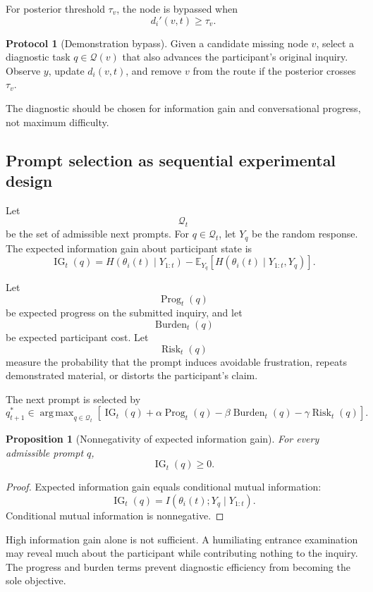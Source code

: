 \documentclass[11pt]{article}
\newtheorem{proposition}[definition]{Proposition}
\theoremstyle{definition}
\newtheorem{protocol}[definition]{Protocol}
\DeclareMathOperator{\argmax}{arg\,max}
\DeclareMathOperator{\IG}{IG}
\DeclareMathOperator{\Prog}{Prog}
\DeclareMathOperator{\Burden}{Burden}
\DeclareMathOperator{\Risk}{Risk}
\newcommand{\E}{\mathbb{E}}
\begin{document}
For posterior threshold \(\tau_v\), the node is bypassed when
\[
d_i'(v,t)\geq\tau_v.
\]

\begin{protocol}[Demonstration bypass]
Given a candidate missing node \(v\), select a diagnostic task \(q\in\mathcal Q(v)\) that also advances the participant's original inquiry. Observe \(y\), update \(d_i(v,t)\), and remove \(v\) from the route if the posterior crosses \(\tau_v\).
\end{protocol}

The diagnostic should be chosen for information gain and conversational progress, not maximum difficulty.

\subsection{Prompt selection as sequential experimental design}

Let
\[
\mathcal Q_t
\]
be the set of admissible next prompts. For \(q\in\mathcal Q_t\), let \(Y_q\) be the random response. The expected information gain about participant state is
\[
\IG_t(q)
=
H(\theta_i(t)\mid Y_{1:t})
-
\E_{Y_q}
\left[
H(\theta_i(t)\mid Y_{1:t},Y_q)
\right].
\]

Let
\[
\Prog_t(q)
\]
be expected progress on the submitted inquiry, and let
\[
\Burden_t(q)
\]
be expected participant cost. Let
\[
\Risk_t(q)
\]
measure the probability that the prompt induces avoidable frustration, repeats demonstrated material, or distorts the participant's claim.

The next prompt is selected by
\[
q_{t+1}^{*}
\in
\argmax_{q\in\mathcal Q_t}
\left[
\IG_t(q)
+
\alpha\Prog_t(q)
-
\beta\Burden_t(q)
-
\gamma\Risk_t(q)
\right].
\]

\begin{proposition}[Nonnegativity of expected information gain]
For every admissible prompt \(q\),
\[
\IG_t(q)\geq0.
\]
\end{proposition}

\begin{proof}
Expected information gain equals conditional mutual information:
\[
\IG_t(q)
=
I(\theta_i(t);Y_q\mid Y_{1:t}).
\]
Conditional mutual information is nonnegative.
\end{proof}

High information gain alone is not sufficient. A humiliating entrance examination may reveal much about the participant while contributing nothing to the inquiry. The progress and burden terms prevent diagnostic efficiency from becoming the sole objective.
\end{document}

